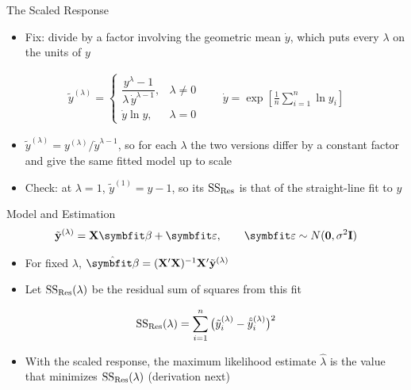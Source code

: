 \begin{frame}{The Scaled Response}
\begin{itemize}
    \item Fix: divide by a factor involving the geometric mean $\dot{y}$, which puts every $\lambda$ on the units of $y$
\end{itemize}
\begin{align*}
    \tilde{y}^{(\lambda)} =
    \begin{cases}
        \dfrac{y^\lambda - 1}{\lambda\,\dot{y}^{\lambda - 1}}, & \lambda \neq 0 \\[1ex]
        \dot{y} \ln y, & \lambda = 0
    \end{cases}
    \qquad
    \dot{y} = \exp\!\left[\frac{1}{n}\sum_{i=1}^{n} \ln y_i\right]
\end{align*}
\begin{itemize}
    \item $\tilde{y}^{(\lambda)} = y^{(\lambda)}/\dot{y}^{\lambda - 1}$, so for each $\lambda$ the two versions differ by a constant factor and give the same fitted model up to scale
    \item Check: at $\lambda = 1$, $\tilde{y}^{(1)} = y - 1$, so its $\mathrm{SS}_{\mathrm{Res}}$ is that of the straight-line fit to $y$
\end{itemize}
\end{frame}


\begin{frame}{Model and Estimation}
\begin{align*}
    \tilde{\by}^{(\lambda)} = \bX\bbeta + \bvarepsilon, \qquad \bvarepsilon \sim N(\bzero, \sigma^2 \bI)
\end{align*}
\begin{itemize}
    \item For fixed $\lambda$, $\hat{\bbeta} = (\bX'\bX)^{-1}\bX'\tilde{\by}^{(\lambda)}$
    \item Let $\mathrm{SS}_{\mathrm{Res}}(\lambda)$ be the residual sum of squares from this fit
\end{itemize}
\begin{align*}
    \mathrm{SS}_{\mathrm{Res}}(\lambda) = \sum_{i=1}^{n} \big( \tilde{y}_i^{(\lambda)} - \hat{\tilde{y}}_i^{(\lambda)} \big)^2
\end{align*}
\begin{itemize}
    \item With the scaled response, the maximum likelihood estimate $\hat{\lambda}$ is the value that minimizes $\mathrm{SS}_{\mathrm{Res}}(\lambda)$ (derivation next)
\end{itemize}
\end{frame}


